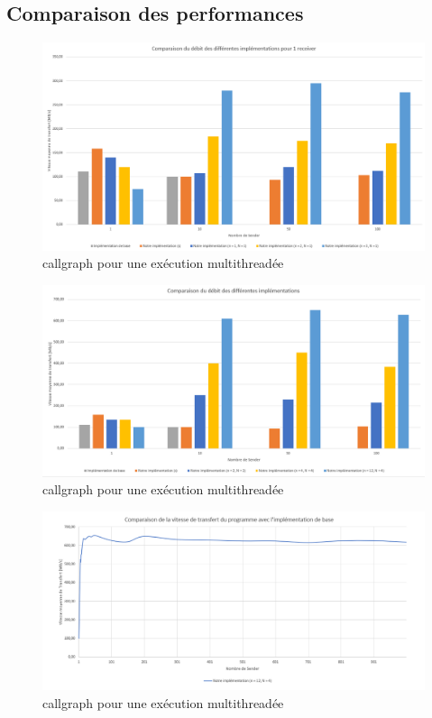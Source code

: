 \documentclass[../main.tex]{subfiles}
\begin{document}
\subsection{Comparaison des performances}

\newpage
\begin{figure}
    \includegraphics[scale=1.2]{assets/test_1.PNG}
    \caption{callgraph pour une exécution multithreadée}
    \label{sec:plot_1_recv}
\end{figure}

\newpage
\begin{figure}
    \includegraphics[scale=1.2]{assets/test_mul.PNG}
    \caption{callgraph pour une exécution multithreadée}
    \label{sec:plot_mul_recv}
\end{figure}

\newpage
\begin{figure}
    \includegraphics[scale=1.2]{assets/test_max.PNG}
    \caption{callgraph pour une exécution multithreadée}
    \label{sec:plot_max}
\end{figure}
\end{document}
